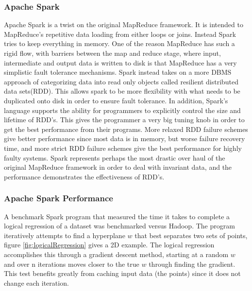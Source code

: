 \documentclass[10pt,twocolumn]{IEEEtran11}
\begin{document}
\subsubsection{Apache Spark}
Apache Spark is a twist on the original MapReduce framework.  It is intended to MapReduce's repetitive data loading from either loops or joins.  Instead Spark tries to keep everything in memory.   One of the reason MapReduce has such a rigid flow, with barriers between the map and reduce stage, where input, intermediate and output data is written to disk is that MapReduce has a very simplistic fault tolerance mechanisms.  Spark instead takes on a more DBMS approach of categorizing data into read only objects called resilient distributed data sets(RDD).  This allows spark to be more flexibility with what needs to be duplicated onto disk in order to ensure fault tolerance.  In addition, Spark's language supports the ability for programmers to explicitly control the size and lifetime of RDD's.  This gives the programmer a very big tuning knob in order to get the best performance  from their programs. More relaxed RDD failure schemes give better performance since most data is in memory, but worse failure recovery time, and more strict RDD failure schemes give the best performance for highly faulty systems.  Spark represents perhaps the most drastic over haul of the original MapReduce framework in order to deal with invariant data, and the performance demonstrates the effectiveness of RDD's.


\subsubsection{Apache Spark Performance}

A benchmark Spark program that measured the time it takes to complete a logical regression of a dataset was benchmarked versus Hadoop.  The program iteratively attempts to find a hyperplane $w$ that best separates two sets of points, figure \ref{fig:logicalRegression} gives a 2D example.   The logical regression accomplishes this through a gradient descent method, starting at a random $w$ and over n iterations moves closer to the true $w$ through finding the gradient.  This test benefits greatly from caching input data (the points) since it does not change each iteration.
\end{document}
